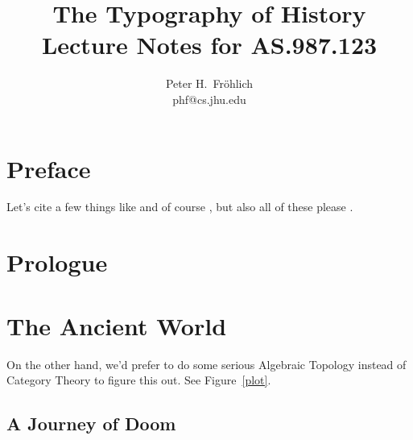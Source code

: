 \documentclass[11pt]{book}
\title{\textbf{The Typography of History}\\
Lecture Notes for AS.987.123}
\author{Peter H.\ Fr{\"o}hlich\\
phf@cs.jhu.edu}
\begin{document}
\frontmatter

\maketitle

\chapter{Preface}

\lipsum[1]

Let's cite a few things like \cite{kant02} and of
course \cite{lamport94}, but also all of these
please \cite{Conway2000,Meyer2000,Huetal2000,LaTeXe,lshort,Gill}.
\lipsum[3-4]

\tableofcontents
\listoffigures
\listoftables

\mainmatter

\chapter{Prologue}
\lipsum[1-10]

\chapter{The Ancient World}
\lipsum[2]

On the other hand, we'd prefer to do some
serious Algebraic Topology
instead of Category Theory to figure this out.
See Figure~\vref{plot}.

\section{A Journey of Doom}
\lipsum[1-4]
\end{document}
